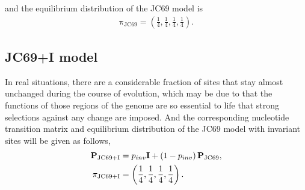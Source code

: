 \documentclass{article}
\begin{document}
and the equilibrium distribution of the JC69 model is
\begin{align*}
\mathrm{\pi}_{\mathrm{JC69}}=\left(\frac{1}{4},\frac{1}{4},\frac{1}{4},\frac{1}{4}\right).
\end{align*}
\subsection{JC69+I model}\label{subsec:MLJC69I}
In real situations, there are a considerable fraction of sites that stay almost unchanged during the course of evolution, which may be due to that the functions of those regions of the genome are so essential to life that strong selections against any change are imposed. And the corresponding nucleotide transition matrix and equilibrium distribution of the JC69 model with invariant sites will be given as follows,
\begin{align*}
{\bf P}_{\mathrm{JC69+I}}&=p_{inv}{\bf I}+\left(1-p_{inv}\right){\bf P}_{\mathrm{JC69}},\\
\mathrm{\pi}_{\mathrm{JC69+I}}&=\left(\frac{1}{4},\frac{1}{4},\frac{1}{4},\frac{1}{4}\right).
\end{align*}
\end{document}
